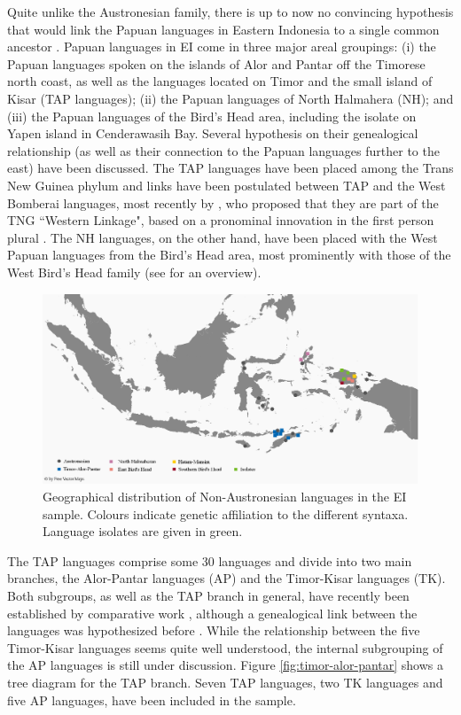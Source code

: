 Quite unlike the Austronesian family, there is up to now no convincing hypothesis that would link the Papuan languages in Eastern Indonesia to a single common ancestor \citep{reesink2005west, klamer2008east}. Papuan languages in EI come in three major areal groupings: (i) the Papuan languages spoken on the islands of Alor and Pantar off the Timorese north coast, as well as the languages located on Timor and the small island of Kisar (\textsc{TAP} languages); (ii) the Papuan languages of North Halmahera (NH); and (iii) the Papuan languages of the Bird's Head area, including the isolate  on Yapen island in Cenderawasih Bay. Several hypothesis on their genealogical relationship (as well as their connection to the Papuan languages further to the east) have been discussed. The TAP languages have been placed among the Trans New Guinea phylum and links have been postulated between TAP and the West Bomberai languages, most recently by \citealt{Ross2005}, who proposed that they are part of the TNG ``Western Linkage", based on a pronominal innovation in the first person plural \citep[9]{schapper2014intro}. The NH languages, on the other hand, have been placed with the West Papuan languages from the Bird's Head area, most prominently with those of the West Bird's Head family (see \citealt{reesink2005west} for an overview).

\begin{figure}
\includegraphics[width=\columnwidth]{figures/Map_overview_klein_Papuaff.eps}
\caption[Geographical distribution of Non-Austronesian languages in the sample]{Geographical distribution of Non-Austronesian languages in the EI sample. Colours indicate genetic affiliation to the different syntaxa. Language isolates are given in green.}\label{map:Austro2}
\end{figure}

The TAP languages comprise some 30 languages and divide into two main branches, the Alor-Pantar languages (\textsc{AP}) and the Timor-Kisar languages (\textsc{TK}). Both subgroups, as well as the TAP branch in general, have recently been established by comparative work \citep{holton2012historical, klamer2014alor}, although a genealogical link between the languages was hypothesized before \citep[7]{schapper2014intro}. While the relationship between the five Timor-Kisar languages seems quite well understood, the internal subgrouping of the AP languages is still under discussion. Figure \ref{fig:timor-alor-pantar} shows a tree diagram for the TAP branch. Seven TAP languages, two TK languages and five AP languages, have been included in the sample.

